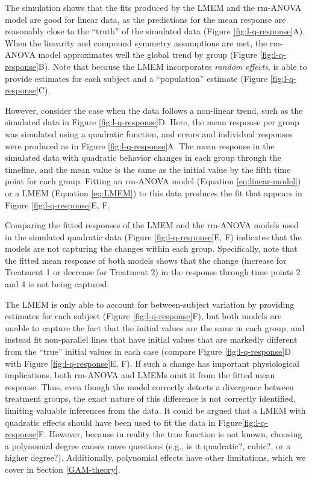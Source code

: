 \documentclass[
]{article}
\begin{document}
The simulation shows that the fits produced by the LMEM and the rm-ANOVA model are good for linear data, as the predictions for the mean response are reasonably close to the ``truth'' of the simulated data (Figure \ref{fig:l-q-response}A). When the linearity and compound symmetry assumptions are met, the rm-ANOVA model approximates well the global trend by group (Figure \ref{fig:l-q-response}B). Note that because the LMEM incorporates \emph{random effects}, is able to provide estimates for each subject and a ``population'' estimate (Figure \ref{fig:l-q-response}C).

However, consider the case when the data follows a non-linear trend, such as the simulated data in Figure \ref{fig:l-q-response}D. Here, the mean response per group was simulated using a quadratic function, and errors and individual responses were produced as in Figure \ref{fig:l-q-response}A. The mean response in the simulated data with quadratic behavior changes in each group through the timeline, and the mean value is the same as the initial value by the fifth time point for each group. Fitting an rm-ANOVA model (Equation \eqref{eq:linear-model}) or a LMEM (Equation \eqref{eq:LMEM}) to this data produces the fit that appears in Figure \ref{fig:l-q-response}E, F.

Comparing the fitted responses of the LMEM and the rm-ANOVA models used in the simulated quadratic data (Figure \ref{fig:l-q-response}E, F) indicates that the models are not capturing the changes within each group. Specifically, note that the fitted mean response of both models shows that the change (increase for Treatment 1 or decrease for Treatment 2) in the response through time points 2 and 4 is not being captured.

The LMEM is only able to account for between-subject variation by providing estimates for each subject (Figure \ref{fig:l-q-response}F), but both models are unable to capture the fact that the initial values are the same in each group, and instead fit non-parallel lines that have initial values that are markedly different from the ``true'' initial values in each case (compare Figure \ref{fig:l-q-response}D with Figure \ref{fig:l-q-response}E, F). If such a change has important physiological implications, both rm-ANOVA and LMEMs omit it from the fitted mean response. Thus, even though the model correctly detects a divergence between treatment groups, the exact nature of this difference is not correctly identified, limiting valuable inferences from the data. It could be argued that a LMEM with quadratic effects should have been used to fit the data in Figure\ref{fig:l-q-response}F. However, because in reality the true function is not known, choosing a polynomial degree causes more questions (e.g., is it quadratic?, cubic?, or a higher degree?). Additionally, polynomial effects have other limitations, which we cover in Section \ref{GAM-theory}.
\end{document}
